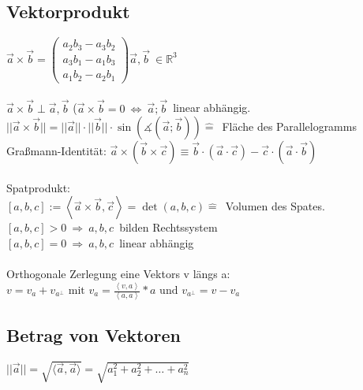 \documentclass[7pt,a4paper]{scrartcl}
\begin{document}
\begin{multicols}{3}
\subsection{Vektorprodukt}
$\vec a\times\vec b=\left( \begin{matrix} a_2b_3-a_3b_2\\a_3b_1-a_1b_3\\a_1b_2-a_2b_1\end{matrix}\right)$\qquad $\vec a,\vec b\ \in \mathbb R^3$\\
\\
$\vec a\times\vec b \perp \vec a,\vec b$ \qquad ($\vec a\times\vec b=0\ \Leftrightarrow\ \vec a;\vec b$\ linear abhängig.\\
$||\vec a\times\vec b||=||\vec a||\cdot||\vec b||\cdot \sin\left(\measuredangle (\vec a;\vec b)\right)\mathrel{\widehat{=}}$\ Fläche des Parallelogramms\\
Graßmann-Identität: $\vec a\times(\vec b \times \vec c)\equiv\vec b\cdot(\vec a \cdot \vec c)-\vec c\cdot(\vec a \cdot \vec b)$\\
\\
Spatprodukt:\\
$[a,b,c]:=\left\langle \vec a\times\vec b,\vec c\right\rangle=\det (a,b,c)\mathrel{\widehat{=}}$\ Volumen des Spates.\\
$[a,b,c]>0\ \Rightarrow\ a,b,c$\ bilden Rechtssystem \\ $[a,b,c]=0\ \Rightarrow\ a,b,c$\ linear abhängig\\ \\
Orthogonale Zerlegung eine Vektors v längs a:\\
$v = v_a + v_{a^\perp} \text{ mit } v_a = \frac{\left\langle v, a\right\rangle }{\left\langle a, a\right\rangle }*a \text{ und }	 v_{a^\perp} = v - v_a	$

\subsection{Betrag von Vektoren}
$||\vec a||=\sqrt{\langle\vec a,\vec a\rangle} =\sqrt{a_1^2+a_2^2+\ldots +a_n^2}$


\end{multicols}
\end{document}
